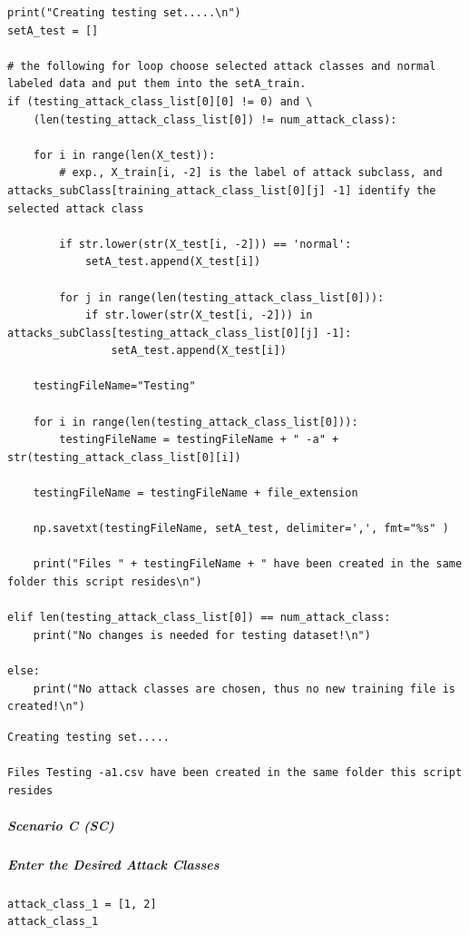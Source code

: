 \begin{verbatim}
print("Creating testing set.....\n")    
setA_test = []

# the following for loop choose selected attack classes and normal labeled data and put them into the setA_train.
if (testing_attack_class_list[0][0] != 0) and \
    (len(testing_attack_class_list[0]) != num_attack_class):

    for i in range(len(X_test)):
        # exp., X_train[i, -2] is the label of attack subclass, and attacks_subClass[training_attack_class_list[0][j] -1] identify the selected attack class

        if str.lower(str(X_test[i, -2])) == 'normal':
            setA_test.append(X_test[i])

        for j in range(len(testing_attack_class_list[0])):
            if str.lower(str(X_test[i, -2])) in attacks_subClass[testing_attack_class_list[0][j] -1]:
                setA_test.append(X_test[i])

    testingFileName="Testing"

    for i in range(len(testing_attack_class_list[0])):
        testingFileName = testingFileName + " -a" + str(testing_attack_class_list[0][i])

    testingFileName = testingFileName + file_extension

    np.savetxt(testingFileName, setA_test, delimiter=',', fmt="%s" )

    print("Files " + testingFileName + " have been created in the same folder this script resides\n")

elif len(testing_attack_class_list[0]) == num_attack_class:
    print("No changes is needed for testing dataset!\n")

else:
    print("No attack classes are chosen, thus no new training file is created!\n")
\end{verbatim}

\begin{verbatim}
Creating testing set.....

Files Testing -a1.csv have been created in the same folder this script resides
\end{verbatim}

\subparagraph{Scenario C (SC)}

\subparagraph{Enter the Desired Attack Classes}

\begin{verbatim}
attack_class_1 = [1, 2]
attack_class_1
\end{verbatim}

